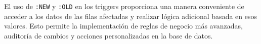 \documentclass[executivepaper]{article}
\begin{document}
El uso de \texttt{:NEW} y \texttt{:OLD} en los triggers proporciona una manera conveniente de acceder a los datos de las filas afectadas y realizar lógica adicional basada en esos valores. Esto permite la implementación de reglas de negocio más avanzadas, auditoría de cambios y acciones personalizadas en la base de datos.
\end{document}
